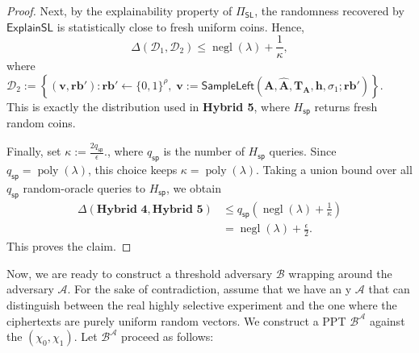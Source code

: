 \begin{proof}
Next, by the explainability property of $\Pi_{\mathsf{SL}}$, the randomness
recovered by $\mathsf{ExplainSL}$ is statistically close to fresh uniform
coins. Hence,
\[
    \Delta(\mathcal D_1,\mathcal D_2)
    \le
    \operatorname{negl}(\lambda)+\frac{1}{\kappa},
\]
where
$
    \mathcal D_2
    :=
    \left\{
        (\mathbf v,\mathbf{rb}') :
        \mathbf{rb}'\leftarrow\{0,1\}^{\rho},
        \;
        \mathbf v :=
        \mathsf{SampleLeft}
        (
            \mathbf A,
            \widehat{\mathbf A},
            \mathbf T_{\mathbf A},
            \mathbf h,
            \sigma_1;
            \mathbf{rb}'
        )
    \right\}.
$\\
This is exactly the distribution used in \textbf{Hybrid 5}, where
$H_{\mathsf{sp}}$ returns fresh random coins.

Finally, set
$
    \kappa := \frac{2q_{\mathsf{sp}}}{\epsilon}.
$, where $q_{\mathsf{sp}}$ is the number of $H_{\mathsf{sp}}$ queries.
Since $q_{\mathsf{sp}}=\operatorname{poly}(\lambda)$, this choice keeps
$\kappa=\operatorname{poly}(\lambda)$. Taking a union bound over all
$q_{\mathsf{sp}}$ random-oracle queries to $H_{\mathsf{sp}}$, we obtain
\[
\begin{aligned}
    \Delta(\textbf{Hybrid 4},\textbf{Hybrid 5})
    &\le
    q_{\mathsf{sp}}
    \left(
        \operatorname{negl}(\lambda)+\frac{1}{\kappa}
    \right)  \\
    &=
    \operatorname{negl}(\lambda)+\frac{\epsilon}{2}.
\end{aligned}
\]
This proves the claim.
\end{proof}
Now, we are ready to construct a threshold adversary $\mathcal{B}$ wrapping around the adversary $\mathcal{A}$. For the sake of contradiction, assume that we have an y $\mathcal{A}$ that can distinguish between the real highly selective experiment and the one where the ciphertexts are purely uniform random vectors. We construct a PPT $\mathcal{B}^\mathcal{A}$ against the $(\chi_0,\chi_1)$. Let  $\mathcal{B}^\mathcal{A}$ proceed as follows:


